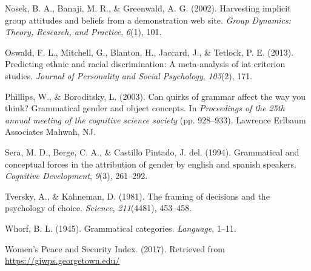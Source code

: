 \documentclass[10pt, letterpaper]{article}
\begin{document}
\hypertarget{ref-nosek2002harvesting}{}
Nosek, B. A., Banaji, M. R., \& Greenwald, A. G. (2002). Harvesting
implicit group attitudes and beliefs from a demonstration web site.
\emph{Group Dynamics: Theory, Research, and Practice}, \emph{6}(1), 101.

\hypertarget{ref-oswald2013predicting}{}
Oswald, F. L., Mitchell, G., Blanton, H., Jaccard, J., \& Tetlock, P. E.
(2013). Predicting ethnic and racial discrimination: A meta-analysis of
iat criterion studies. \emph{Journal of Personality and Social
Psychology}, \emph{105}(2), 171.

\hypertarget{ref-phillips2003can}{}
Phillips, W., \& Boroditsky, L. (2003). Can quirks of grammar affect the
way you think? Grammatical gender and object concepts. In
\emph{Proceedings of the 25th annual meeting of the cognitive science
society} (pp. 928--933). Lawrence Erlbaum Associates Mahwah, NJ.

\hypertarget{ref-sera1994grammatical}{}
Sera, M. D., Berge, C. A., \& Castillo Pintado, J. del. (1994).
Grammatical and conceptual forces in the attribution of gender by
english and spanish speakers. \emph{Cognitive Development}, \emph{9}(3),
261--292.

\hypertarget{ref-tversky1981framing}{}
Tversky, A., \& Kahneman, D. (1981). The framing of decisions and the
psychology of choice. \emph{Science}, \emph{211}(4481), 453--458.

\hypertarget{ref-whorf1945grammatical}{}
Whorf, B. L. (1945). Grammatical categories. \emph{Language}, 1--11.

\hypertarget{ref-wps}{}
Women's Peace and Security Index. (2017). Retrieved from
\url{https://giwps.georgetown.edu/}
\end{document}
